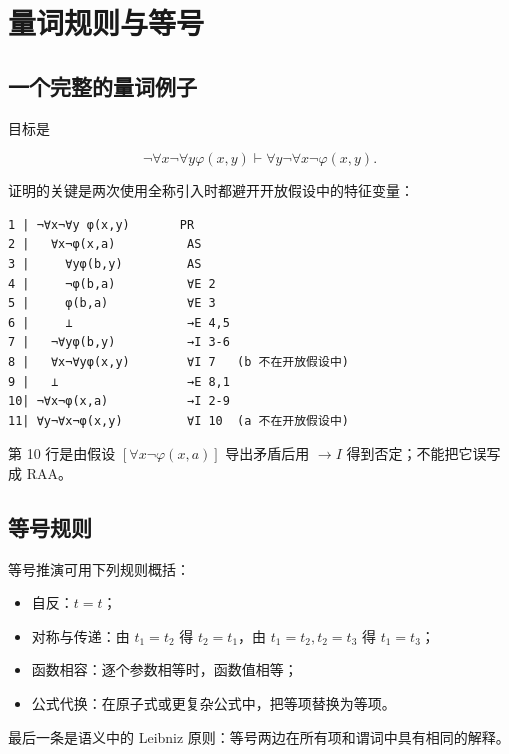 \section{量词规则与等号}


\subsection{一个完整的量词例子}


目标是

\[
\neg\forall x\neg\forall y\varphi(x,y)
\vdash
\forall y\neg\forall x\neg\varphi(x,y).
\]

证明的关键是两次使用全称引入时都避开开放假设中的特征变量：

\begin{verbatim}
1 | ¬∀x¬∀y φ(x,y)       PR
2 |   ∀x¬φ(x,a)          AS
3 |     ∀yφ(b,y)         AS
4 |     ¬φ(b,a)          ∀E 2
5 |     φ(b,a)           ∀E 3
6 |     ⊥                →E 4,5
7 |   ¬∀yφ(b,y)          →I 3-6
8 |   ∀x¬∀yφ(x,y)        ∀I 7   (b 不在开放假设中)
9 |   ⊥                  →E 8,1
10| ¬∀x¬φ(x,a)           →I 2-9
11| ∀y¬∀x¬φ(x,y)         ∀I 10  (a 不在开放假设中)
\end{verbatim}


第 10 行是由假设 $[\forall x\neg\varphi(x,a)]$ 导出矛盾后用 $\to I$ 得到否定；不能把它误写成 RAA。

\subsection{等号规则}


等号推演可用下列规则概括：

\begin{itemize}
\item 自反：$t=t$；
\item 对称与传递：由 $t_1=t_2$ 得 $t_2=t_1$，由 $t_1=t_2,t_2=t_3$ 得 $t_1=t_3$；
\item 函数相容：逐个参数相等时，函数值相等；
\item 公式代换：在原子式或更复杂公式中，把等项替换为等项。
\end{itemize}


最后一条是语义中的 Leibniz 原则：等号两边在所有项和谓词中具有相同的解释。
